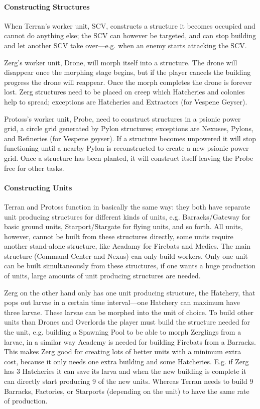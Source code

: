 \paragraph{Constructing Structures}
When Terran's worker unit, SCV, constructs a structure it becomes occupied and cannot do anything else; the SCV can however be targeted, and can stop building and let another SCV take over—e.g. when an enemy starts attacking the SCV.

Zerg’s worker unit, Drone, will morph itself into a structure. The drone will disappear once the morphing stage begins, but if the player cancels the building progress the drone will reappear. Once the morph completes the drone is forever lost. Zerg structures need to be placed on creep which Hatcheries and colonies help to spread; exceptions are Hatcheries and Extractors (for Vespene Geyser).

Protoss’s worker unit, Probe, need to construct structures in a psionic power grid, a circle grid generated by Pylon structures; exceptions are Nexuses, Pylons, and Refineries (for Vespene geyser). If a structure becomes unpowered it will stop functioning until a nearby Pylon is reconstructed to create a new psionic power grid. Once a structure has been planted, it will construct itself leaving the Probe free for other tasks.

\paragraph{Constructing Units}
Terran and Protoss function in basically the same way: they both have separate unit producing structures for different kinds of units, e.g. Barracks/Gateway for basic ground units, Starport/Stargate for flying units, and so forth. All units, however, cannot be built from these structures directly, some units require another stand-alone structure, like Acadamy for Firebats and Medics. The main structure (Command Center and Nexus) can only build workers. Only one unit can be built simultaneously from these structures, if one wants a huge production of units, large amounts of unit producing structures are needed.

Zerg on the other hand only has one unit producing structure, the Hatchery, that pops out larvae in a certain time interval—one Hatchery can maximum have three larvae. These larvae can be morphed into the unit of choice. To build other units than Drones and Overlords the player must build the structure needed for the unit, e.g. building a Spawning Pool to be able to morph Zerglings from a larvae, in a similar way Academy is needed for building Firebats from a Barracks. This makes Zerg good for creating lots of better units with a minimum extra cost, because it only needs one extra building and some Hatcheries. E.g. if Zerg has 3 Hatcheries it can save its larva and when the new building is complete it can directly start producing 9 of the new units. Whereas Terran needs to build 9 Barracks, Factories, or Starports (depending on the unit) to have the same rate of production.

